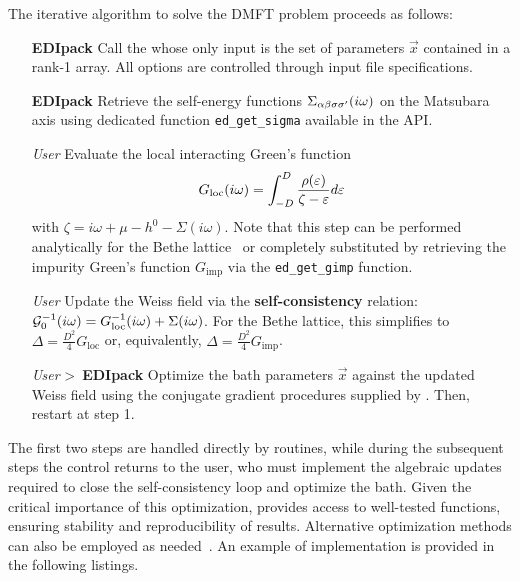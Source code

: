 \documentclass[edipack_sp.tex]{subfiles}
\begin{document}
The iterative algorithm to solve the DMFT problem proceeds as follows:
\begin{itemize}  
\item[{\tiny {\bf EDIpack}}] Call the 
  whose only input is the set of parameters $\vec{x}$ contained in a
  rank-1 array. All  \NAME options are controlled through input file
  specifications.
  
\item[{\tiny {\bf EDIpack}}] Retrieve the self-energy functions $\Sigma_{\alpha\beta\sigma\sigma'}(i\omega)$ on the
  Matsubara axis using dedicated function {\tt ed\_get\_sigma} available in the \NAME API.
  
\item[{\tiny {\it User}}] Evaluate the local interacting Green's function
$$
G_\mathrm{loc}(i\omega) = \int_{-D}^D \frac{\rho(\varepsilon)}{\zeta -\varepsilon}d\varepsilon
$$ 
with  $\zeta=i\omega+\mu-h^0-\Sigma(i\omega)$. Note that this step can be performed analytically for the Bethe lattice~\cite{Georges1996RMP} or completely substituted by retrieving the impurity Green's function $G_\mathrm{imp}$ via the {\tt ed\_get\_gimp} function.
  
\item[{\tiny {\it User}}] Update the Weiss field via the {\bf self-consistency}
  relation: ${\cal G}^{-1}_0(i\omega) = G^{-1}_\mathrm{loc}(i\omega) +
    \Sigma(i\omega)$. For the Bethe lattice, this simplifies to
    $\Delta = \tfrac{D^2}{4}G_\mathrm{loc}$ or, equivalently, $\Delta = \tfrac{D^2}{4}G_\mathrm{imp}$.
    
  \item[{\tiny {\it User} \textgreater\ {\bf EDIpack}}] Optimize the bath parameters $\vec{x}$ against the updated
    Weiss field using the conjugate gradient procedures supplied by \NAME. Then, restart at step 1.
\end{itemize}

The first two steps are handled directly by \NAME routines, while during the subsequent steps the 
 control returns to the user, who must implement the algebraic updates required to 
close the self-consistency loop and optimize the bath.
Given the 
critical importance of this optimization, \NAME provides access to 
well-tested functions, ensuring stability and reproducibility of 
results. Alternative optimization methods can also be employed as 
needed~\cite{Mejuto-Zaera2020PRB,Huang2023PRB,Nakatsukasa2018SJOSC}. 
An example of implementation is provided in the following listings.
\end{document}
